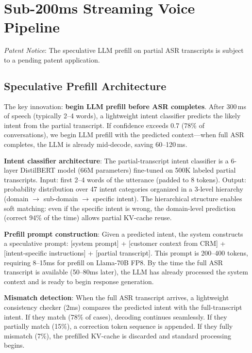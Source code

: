 \documentclass[conference,10pt]{IEEEtran}
\begin{document}
\section{Sub-200ms Streaming Voice Pipeline}
\label{sec:pipeline}


\emph{Patent Notice}: The speculative LLM prefill on partial ASR transcripts is subject to a pending patent application.

\subsection{Speculative Prefill Architecture}

The key innovation: \textbf{begin LLM prefill before ASR completes}. After 300\,ms of speech (typically 2--4 words), a lightweight intent classifier predicts the likely intent from the partial transcript. If confidence exceeds 0.7 (78\% of conversations), we begin LLM prefill with the predicted context---when full ASR completes, the LLM is already mid-decode, saving 60--120\,ms.

\textbf{Intent classifier architecture}: The partial-transcript intent classifier is a 6-layer DistilBERT model (66M parameters) fine-tuned on 500K labeled partial transcripts. Input: first 2--4 words of the utterance (padded to 8 tokens). Output: probability distribution over 47 intent categories organized in a 3-level hierarchy (domain $\to$ sub-domain $\to$ specific intent). The hierarchical structure enables soft matching: even if the specific intent is wrong, the domain-level prediction (correct 94\% of the time) allows partial KV-cache reuse.

\textbf{Prefill prompt construction}: Given a predicted intent, the system constructs a speculative prompt: [system prompt] + [customer context from CRM] + [intent-specific instructions] + [partial transcript]. This prompt is 200--400 tokens, requiring 8--15ms for prefill on Llama-70B FP8. By the time the full ASR transcript is available (50--80ms later), the LLM has already processed the system context and is ready to begin response generation.

\textbf{Mismatch detection}: When the full ASR transcript arrives, a lightweight consistency checker (2ms) compares the predicted intent with the full-transcript intent. If they match (78\% of cases), decoding continues seamlessly. If they partially match (15\%), a correction token sequence is appended. If they fully mismatch (7\%), the prefilled KV-cache is discarded and standard processing begins.
\end{document}
